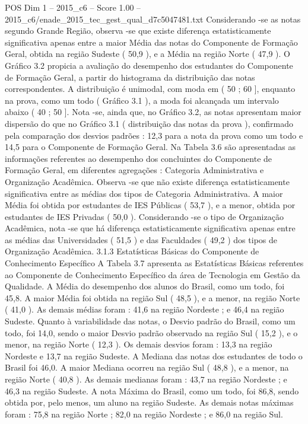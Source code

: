 \begin{textsample}{POS Dim 1 – 2015\_c6 – Score 1.00 – 2015\_c6/enade\_2015\_tec\_gest\_qual\_d7c5047481.txt}
Considerando -se as notas segundo Grande Região, observa -se que existe diferença estatisticamente significativa apenas entre a maior Média das notas do Componente de Formação Geral, obtida na região Sudeste ( 50,9 ), e a Média na região Norte ( 47,9 ).
O Gráfico 3.2 propicia a avaliação do desempenho dos estudantes do Componente de Formação Geral, a partir do histograma da distribuição das notas correspondentes.
A distribuição é unimodal, com moda em ( 50 ; 60 ], enquanto na prova, como um todo ( Gráfico 3.1 ), a moda foi alcançada um intervalo abaixo ( 40 ; 50 ].
Nota -se, ainda que, no Gráfico 3.2, as notas apresentam maior dispersão do que no Gráfico 3.1 ( distribuição das notas da prova ), confirmado pela comparação dos desvios padrões : 12,3 para a nota da prova como um todo e 14,5 para o Componente de Formação Geral.
Na Tabela 3.6 são apresentadas as informações referentes ao desempenho dos concluintes do Componente de Formação Geral, em diferentes agregações : Categoria Administrativa e Organização Acadêmica.
Observa -se que não existe diferença estatisticamente significativa entre as médias dos tipos de Categoria Administrativa.
A maior Média foi obtida por estudantes de IES Públicas ( 53,7 ), e a menor, obtida por estudantes de IES Privadas ( 50,0 ).
Considerando -se o tipo de Organização Acadêmica, nota -se que há diferença estatisticamente significativa apenas entre as médias das Universidades ( 51,5 ) e das Faculdades ( 49,2 ) dos tipos de Organização Acadêmica. 3.1.3 Estatísticas Básicas do Componente de Conhecimento Específico A Tabela 3.7 apresenta as Estatísticas Básicas referentes ao Componente de Conhecimento Específico da área de Tecnologia em Gestão da Qualidade.
A Média do desempenho dos alunos do Brasil, como um todo, foi 45,8.
A maior Média foi obtida na região Sul ( 48,5 ), e a menor, na região Norte ( 41,0 ).
As demais médias foram : 41,6 na região Nordeste ; e 46,4 na região Sudeste.
Quanto à variabilidade das notas, o Desvio padrão do Brasil, como um todo, foi 14,0, sendo o maior Desvio padrão observado na região Sul ( 15,2 ), e o menor, na região Norte ( 12,3 ).
Os demais desvios foram : 13,3 na região Nordeste e 13,7 na região Sudeste.
A Mediana das notas dos estudantes de todo o Brasil foi 46,0.
A maior Mediana ocorreu na região Sul ( 48,8 ), e a menor, na região Norte ( 40,8 ).
As demais medianas foram : 43,7 na região Nordeste ; e 46,3 na região Sudeste.
A nota Máxima do Brasil, como um todo, foi 86,8, sendo obtida por, pelo menos, um aluno na região Sudeste.
As demais notas máximas foram : 75,8 na região Norte ; 82,0 na região Nordeste ; e 86,0 na região Sul.

\end{textsample}
